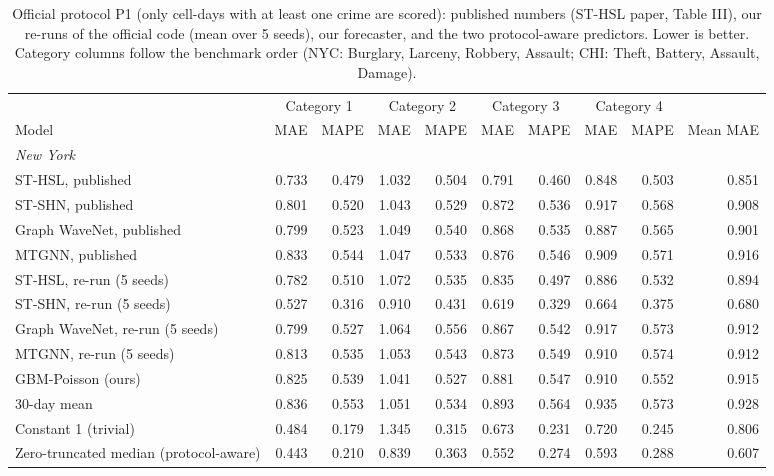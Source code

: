 \begin{table}[!htbp]\centering\scriptsize\setlength{\tabcolsep}{3.5pt}
\caption{Official protocol P1 (only cell-days with at least one crime are scored): published numbers (ST-HSL paper, Table III), our re-runs of the official code (mean over 5 seeds), our forecaster, and the two protocol-aware predictors. Lower is better. Category columns follow the benchmark order (NYC: Burglary, Larceny, Robbery, Assault; CHI: Theft, Battery, Assault, Damage).}\label{tab:official}
\begin{adjustbox}{max width=\linewidth}\begin{tabular}{l*{8}{r}r}\toprule
 & \multicolumn{2}{c}{Category 1} & \multicolumn{2}{c}{Category 2} & \multicolumn{2}{c}{Category 3} & \multicolumn{2}{c}{Category 4} & \\
Model & MAE & MAPE & MAE & MAPE & MAE & MAPE & MAE & MAPE & Mean MAE\\\midrule
\multicolumn{10}{l}{\textit{New York}}\\
ST-HSL, published & 0.733 & 0.479 & 1.032 & 0.504 & 0.791 & 0.460 & 0.848 & 0.503 & 0.851 \\
ST-SHN, published & 0.801 & 0.520 & 1.043 & 0.529 & 0.872 & 0.536 & 0.917 & 0.568 & 0.908 \\
Graph WaveNet, published & 0.799 & 0.523 & 1.049 & 0.540 & 0.868 & 0.535 & 0.887 & 0.565 & 0.901 \\
MTGNN, published & 0.833 & 0.544 & 1.047 & 0.533 & 0.876 & 0.546 & 0.909 & 0.571 & 0.916 \\
ST-HSL, re-run (5 seeds) & 0.782 & 0.510 & 1.072 & 0.535 & 0.835 & 0.497 & 0.886 & 0.532 & 0.894 \\
ST-SHN, re-run (5 seeds) & 0.527 & 0.316 & 0.910 & 0.431 & 0.619 & 0.329 & 0.664 & 0.375 & 0.680 \\
Graph WaveNet, re-run (5 seeds) & 0.799 & 0.527 & 1.064 & 0.556 & 0.867 & 0.542 & 0.917 & 0.573 & 0.912 \\
MTGNN, re-run (5 seeds) & 0.813 & 0.535 & 1.053 & 0.543 & 0.873 & 0.549 & 0.910 & 0.574 & 0.912 \\
GBM-Poisson (ours) & 0.825 & 0.539 & 1.041 & 0.527 & 0.881 & 0.547 & 0.910 & 0.552 & 0.915 \\
30-day mean & 0.836 & 0.553 & 1.051 & 0.534 & 0.893 & 0.564 & 0.935 & 0.573 & 0.928 \\
Constant 1 (trivial) & 0.484 & 0.179 & 1.345 & 0.315 & 0.673 & 0.231 & 0.720 & 0.245 & 0.806 \\
Zero-truncated median (protocol-aware) & 0.443 & 0.210 & 0.839 & 0.363 & 0.552 & 0.274 & 0.593 & 0.288 & 0.607 \\

\end{tabular}
\end{adjustbox}
\end{table}
